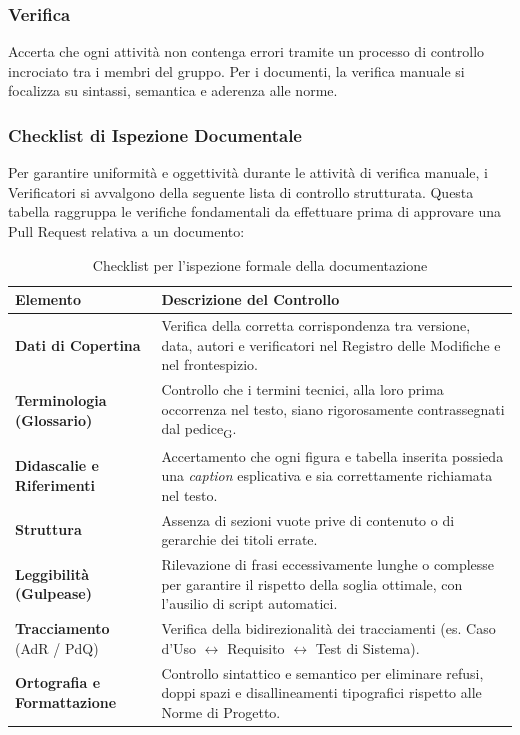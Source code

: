 \subsubsection{Verifica}
Accerta che ogni attività non contenga errori tramite un processo di controllo incrociato tra i membri del gruppo. Per i documenti, la verifica manuale si focalizza su sintassi, semantica e aderenza alle norme.
\vspace{0.5cm}
\subsubsection*{Checklist di Ispezione Documentale}
Per garantire uniformità e oggettività durante le attività di verifica manuale, i Verificatori si avvalgono della seguente lista di controllo strutturata. Questa tabella raggruppa le verifiche fondamentali da effettuare prima di approvare una Pull Request relativa a un documento:

\begin{table}[H]
    \centering
    \renewcommand{\arraystretch}{1.3}
    \begin{tabularx}{\textwidth}{|l|X|}
        \hline
        \rowcolor{primarycolor!10}
        \textbf{Elemento} & \textbf{Descrizione del Controllo} \\
        \hline
        \textbf{Dati di Copertina} & Verifica della corretta corrispondenza tra versione, data, autori e verificatori nel Registro delle Modifiche e nel frontespizio. \\
        \hline
        \textbf{Terminologia (Glossario)} & Controllo che i termini tecnici, alla loro prima occorrenza nel testo, siano rigorosamente contrassegnati dal pedice\textsubscript{G}. \\
        \hline
        \textbf{Didascalie e Riferimenti} & Accertamento che ogni figura e tabella inserita possieda una \textit{caption} esplicativa e sia correttamente richiamata nel testo. \\
        \hline
        \textbf{Struttura} & Assenza di sezioni vuote prive di contenuto o di gerarchie dei titoli errate. \\
        \hline
        \textbf{Leggibilità (Gulpease)} & Rilevazione di frasi eccessivamente lunghe o complesse per garantire il rispetto della soglia ottimale, con l'ausilio di script automatici. \\
        \hline
        \textbf{Tracciamento} (AdR / PdQ) & Verifica della bidirezionalità dei tracciamenti (es. Caso d'Uso $\leftrightarrow$ Requisito $\leftrightarrow$ Test di Sistema). \\
        \hline
        \textbf{Ortografia e Formattazione} & Controllo sintattico e semantico per eliminare refusi, doppi spazi e disallineamenti tipografici rispetto alle Norme di Progetto. \\
        \hline
    \end{tabularx}
    \caption{Checklist per l'ispezione formale della documentazione}
\end{table}

